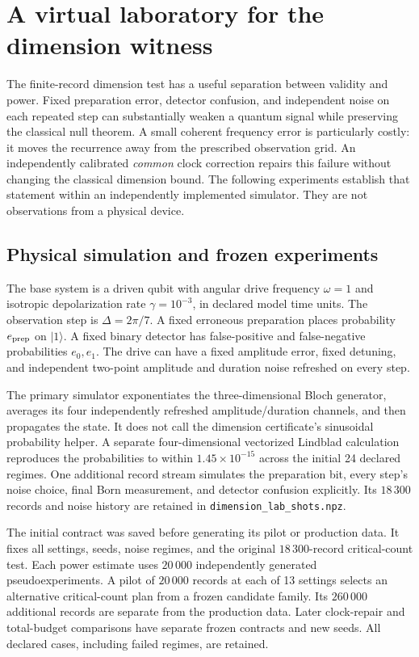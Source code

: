 \chapter{A virtual laboratory for the dimension witness}
\label{ch:dimension-lab}

The finite-record dimension test has a useful separation between validity and
power. Fixed preparation error, detector confusion, and independent noise on
each repeated step can substantially weaken a quantum signal while preserving
the classical null theorem. A small coherent frequency error is particularly
costly: it moves the recurrence away from the prescribed observation grid.
An independently calibrated \emph{common} clock correction repairs this failure
without changing the classical dimension bound. The following experiments
establish that statement within an independently implemented simulator. They
are not observations from a physical device.

\section{Physical simulation and frozen experiments}
The base system is a driven qubit with angular drive frequency $\omega=1$ and
isotropic depolarization rate $\gamma=10^{-3}$, in declared model time units.
The observation step is $\Delta=2\pi/7$. A fixed erroneous preparation places
probability $e_{\rm prep}$ on $|1\rangle$. A fixed binary detector has false-positive
and false-negative probabilities $e_0,e_1$. The drive can have a fixed amplitude
error, fixed detuning, and independent two-point amplitude and duration noise
refreshed on every step.

The primary simulator exponentiates the three-dimensional Bloch generator,
averages its four independently refreshed amplitude/duration channels, and
then propagates the state. It does not call the dimension certificate's
sinusoidal probability helper. A separate four-dimensional vectorized Lindblad
calculation reproduces the probabilities to within $1.45\times10^{-15}$ across
the initial 24 declared regimes. One additional record stream simulates the
preparation bit, every step's noise choice, final Born measurement, and detector
confusion explicitly. Its $18\,300$ records and noise history are retained in
\texttt{dimension\_lab\_shots.npz}.

The initial contract was saved before generating its pilot or production data.
It fixes all settings, seeds, noise regimes, and the original $18\,300$-record
critical-count test. Each power estimate uses $20\,000$ independently generated
pseudoexperiments. A pilot of $20\,000$ records at each of 13 settings selects
an alternative critical-count plan from a frozen candidate family. Its
$260\,000$ additional records are separate from the production data. Later
clock-repair and total-budget comparisons have separate frozen contracts and
new seeds. All declared cases, including failed regimes, are retained.

